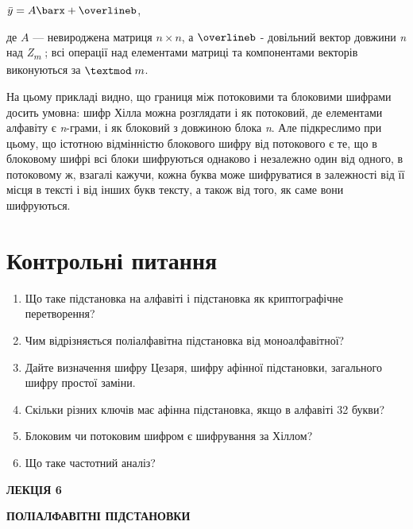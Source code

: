 {{\centering
 $\bar{y}=A\barx+\overlineb$,
\par}

де  $A$ --- невироджена матриця   $n\times n$, а  $\overlineb$ -
довільний вектор довжини \textit{n} над
\textit{Z}\textit{\textsubscript{m}}\textsubscript{ }; всі операції над
елементами матриці та компонентами векторів виконуються за  $\textmod\;m$.

На цьому прикладі видно, що границя між потоковими та блоковими шифрами досить
умовна: шифр Хілла можна розглядати і як потоковий, де елементами алфавіту є
\textit{n}{}-грами, і як блоковий з довжиною блока \textit{n}. Але підкреслимо
при цьому, що істотною відмінністю блокового шифру від потокового є те, що в
блоковому шифрі всі блоки шифруються однаково і незалежно один від одного, в
потоковому ж, взагалі кажучи, кожна буква може шифруватися в залежності від її
місця в тексті і від інших букв тексту, а також від того, як саме вони
шифруються.


\bigskip


\bigskip


\bigskip

\section{Контрольні питання}


\bigskip

\liststyleWWviiiNumxiv
\begin{enumerate}
\item Що таке підстановка на алфавіті і підстановка як криптографічне
перетворення?
\item Чим відрізняється поліалфавітна підстановка від моноалфавітної?
\item Дайте визначення шифру Цезаря, шифру афінної підстановки, загального шифру
простої заміни.
\item Скільки різних ключів має афінна підстановка, якщо в алфавіті 32 букви?
\item Блоковим чи потоковим шифром є шифрування за Хіллом?
\item Що таке частотний аналіз?
\end{enumerate}

\bigskip


\bigskip


\bigskip

{\bfseries
ЛЕКЦІЯ  6}


\bigskip

{\centering\bfseries
ПОЛІАЛФАВІТНІ  ПІДСТАНОВКИ
\par}


}
